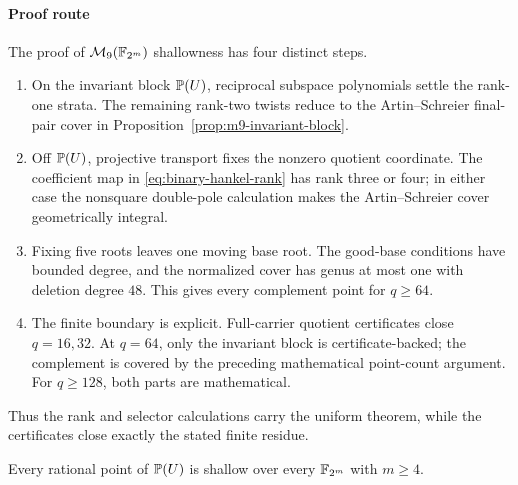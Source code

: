 \paragraph{Proof route}
The proof of \(\mathcal M_9(\mathbb F_{2^m})\) shallowness has four distinct steps.
\begin{enumerate}[label=\textup{(\arabic*)}]
\item On the invariant block \(\mathbb P(U)\), reciprocal subspace polynomials
      settle the rank-one strata.  The remaining rank-two twists reduce to
      the Artin--Schreier final-pair cover in
      Proposition~\ref{prop:m9-invariant-block}.
\item Off \(\mathbb P(U)\), projective transport fixes the nonzero quotient
      coordinate.  The coefficient map in \eqref{eq:binary-hankel-rank} has
      rank three or four; in
      either case the nonsquare double-pole calculation makes the
      Artin--Schreier cover geometrically integral.
\item Fixing five roots leaves one moving base root.  The good-base
      conditions have bounded degree, and the normalized cover has genus at
      most one with deletion degree \(48\).  This gives every complement
      point for \(q\geq64\).
\item The finite boundary is explicit.  Full-carrier quotient certificates
      close \(q=16,32\).  At \(q=64\), only the invariant block is
      certificate-backed; the complement is covered by the preceding
      mathematical point-count argument.  For \(q\geq128\), both parts are
      mathematical.
\end{enumerate}
Thus the rank and selector calculations carry the uniform theorem, while the
certificates close exactly the stated finite residue.

\begin{proposition}\label{prop:m9-invariant-block}%
%
Every rational point of $\mathbb P(U)$ is shallow over every
$\mathbb F_{2^m}$ with $m\geq4$.
\end{proposition}


